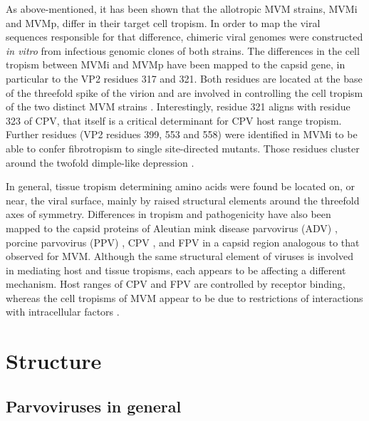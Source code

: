 	As above-mentioned, it has been shown that the allotropic MVM strains, MVMi and MVMp, differ in their target cell tropism. In order to map the viral sequences responsible for that difference, chimeric viral genomes were constructed \textit{in vitro} from infectious genomic clones of both strains. The differences in the cell tropism between MVMi and MVMp have been mapped to the capsid gene, in particular to the VP2 residues 317 and 321. Both residues are located at the base of the threefold spike of the virion and are involved in controlling the cell tropism of the two distinct MVM strains \cite{pmid3357208, pmid3392768, pmid3257270}.  Interestingly, residue 321 aligns with residue 323 of CPV, that itself is a critical determinant for CPV host range tropism. Further residues (VP2 residues 399, 553 and 558) were identified in MVMi to be able to confer fibrotropism to single site-directed mutants. Those residues cluster around the twofold dimple-like depression \cite{pmid9817841}. 
	
	In general, tissue tropism determining amino acids were found be located on, or near, the viral surface, mainly by raised structural elements around the threefold axes of symmetry. Differences in tropism and pathogenicity have also been mapped to the capsid proteins of Aleutian mink disease parvovirus (ADV) \cite{pmid8396664}, porcine parvovirus (PPV)  \cite{pmid8642680}, CPV \cite{pmid3176341, pmid1331498}, and FPV \cite{pmid7513918} in a capsid region analogous to that observed for MVM. Although the same structural element of viruses is involved in mediating host and tissue tropisms, each appears to be affecting a different mechanism. Host ranges of CPV and FPV are controlled by receptor binding, whereas the cell tropisms of MVM appear to be due to restrictions of interactions with intracellular factors \cite{pmid9817841, pmid12941411}.



\section{Structure}

\subsection{Parvoviruses in general}

